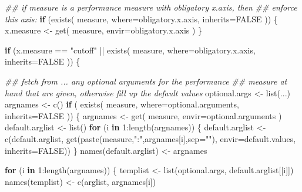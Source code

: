 \documentclass[
  letterpaper,
  DIV=11,
  numbers=noendperiod]{scrartcl}
\newenvironment{Shaded}{\begin{snugshade}}{\end{snugshade}}
\newcommand{\AttributeTok}[1]{\textcolor[rgb]{0.40,0.45,0.13}{#1}}
\newcommand{\ConstantTok}[1]{\textcolor[rgb]{0.56,0.35,0.01}{#1}}
\newcommand{\ControlFlowTok}[1]{\textcolor[rgb]{0.00,0.23,0.31}{\textbf{#1}}}
\newcommand{\DecValTok}[1]{\textcolor[rgb]{0.68,0.00,0.00}{#1}}
\newcommand{\DocumentationTok}[1]{\textcolor[rgb]{0.37,0.37,0.37}{\textit{#1}}}
\newcommand{\FunctionTok}[1]{\textcolor[rgb]{0.28,0.35,0.67}{#1}}
\newcommand{\NormalTok}[1]{\textcolor[rgb]{0.00,0.23,0.31}{#1}}
\newcommand{\OtherTok}[1]{\textcolor[rgb]{0.00,0.23,0.31}{#1}}
\newcommand{\SpecialCharTok}[1]{\textcolor[rgb]{0.37,0.37,0.37}{#1}}
\newcommand{\StringTok}[1]{\textcolor[rgb]{0.13,0.47,0.30}{#1}}
\begin{document}
\begin{Shaded}
\begin{Highlighting}[]
    \DocumentationTok{\#\# if measure is a performance measure with obligatory x.axis, then}
    \DocumentationTok{\#\# enforce this axis:}
    \ControlFlowTok{if}\NormalTok{ (}\FunctionTok{exists}\NormalTok{( measure, }\AttributeTok{where=}\NormalTok{obligatory.x.axis, }\AttributeTok{inherits=}\ConstantTok{FALSE}\NormalTok{ )) \{}
\NormalTok{        x.measure }\OtherTok{\textless{}{-}} \FunctionTok{get}\NormalTok{( measure, }\AttributeTok{envir=}\NormalTok{obligatory.x.axis )}
\NormalTok{    \}}

    \ControlFlowTok{if}\NormalTok{ (x.measure }\SpecialCharTok{==} \StringTok{"cutoff"} \SpecialCharTok{||}
        \FunctionTok{exists}\NormalTok{( measure, }\AttributeTok{where=}\NormalTok{obligatory.x.axis, }\AttributeTok{inherits=}\ConstantTok{FALSE}\NormalTok{ )) \{}

        \DocumentationTok{\#\# fetch from \textquotesingle{}...\textquotesingle{} any optional arguments for the performance}
        \DocumentationTok{\#\# measure at hand that are given, otherwise fill up the default values}
\NormalTok{        optional.args }\OtherTok{\textless{}{-}} \FunctionTok{list}\NormalTok{(...)}
\NormalTok{        argnames }\OtherTok{\textless{}{-}} \FunctionTok{c}\NormalTok{()}
        \ControlFlowTok{if}\NormalTok{ ( }\FunctionTok{exists}\NormalTok{( measure, }\AttributeTok{where=}\NormalTok{optional.arguments, }\AttributeTok{inherits=}\ConstantTok{FALSE}\NormalTok{ )) \{}
\NormalTok{            argnames }\OtherTok{\textless{}{-}} \FunctionTok{get}\NormalTok{( measure, }\AttributeTok{envir=}\NormalTok{optional.arguments )}
\NormalTok{            default.arglist }\OtherTok{\textless{}{-}} \FunctionTok{list}\NormalTok{()}
            \ControlFlowTok{for}\NormalTok{ (i }\ControlFlowTok{in} \DecValTok{1}\SpecialCharTok{:}\FunctionTok{length}\NormalTok{(argnames)) \{}
\NormalTok{                default.arglist }\OtherTok{\textless{}{-}} \FunctionTok{c}\NormalTok{(default.arglist,}
                                     \FunctionTok{get}\NormalTok{(}\FunctionTok{paste}\NormalTok{(measure,}\StringTok{":"}\NormalTok{,argnames[i],}\AttributeTok{sep=}\StringTok{""}\NormalTok{),}
                                         \AttributeTok{envir=}\NormalTok{default.values, }\AttributeTok{inherits=}\ConstantTok{FALSE}\NormalTok{))}
\NormalTok{            \}}
            \FunctionTok{names}\NormalTok{(default.arglist) }\OtherTok{\textless{}{-}}\NormalTok{ argnames}

            \ControlFlowTok{for}\NormalTok{ (i }\ControlFlowTok{in} \DecValTok{1}\SpecialCharTok{:}\FunctionTok{length}\NormalTok{(argnames)) \{}
\NormalTok{                templist }\OtherTok{\textless{}{-}} \FunctionTok{list}\NormalTok{(optional.args,}
\NormalTok{                                 default.arglist[[i]])}
                \FunctionTok{names}\NormalTok{(templist) }\OtherTok{\textless{}{-}} \FunctionTok{c}\NormalTok{(}\StringTok{\textquotesingle{}arglist\textquotesingle{}}\NormalTok{, argnames[i])}
                

\end{Highlighting}
\end{Shaded}
\end{document}
